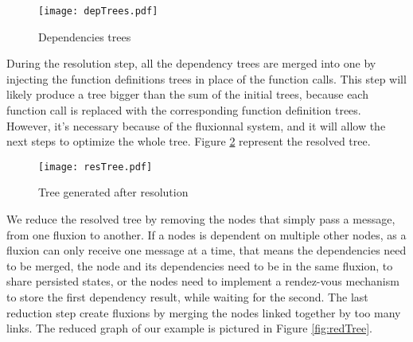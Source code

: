 
\begin{figure}[h!]
  \texttt{[image: depTrees.pdf]}
  \caption{Dependencies trees}
  \label{fig:depTrees}
\end{figure}



During the resolution step, all the dependency trees are merged into one by injecting the function definitions trees in place of the function calls.
This step will likely produce a tree bigger than the sum of the initial trees, because each function call is replaced with the corresponding function definition trees.
However, it's necessary because of the fluxionnal system, and it will allow the next steps to optimize the whole tree.
Figure \ref{fig:resTree} represent the resolved tree.


\begin{figure}[h!]
  \texttt{[image: resTree.pdf]}
  \caption{Tree generated after resolution}
  \label{fig:resTree}
\end{figure}


We reduce the resolved tree by removing the nodes that simply pass a message, from one fluxion to another.
If a nodes is dependent on multiple other nodes, as a fluxion can only receive one message at a time, that means the dependencies need to be merged, the node and its dependencies need to be in the same fluxion, to share persisted states, or the nodes need to implement a rendez-vous mechanism to store the first dependency result, while waiting for the second.
The last reduction step create fluxions by merging the nodes linked together by too many links.
The reduced graph of our example is pictured in Figure \ref{fig:redTree}.


